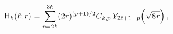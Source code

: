 \[{\sf H}_{k}(\ell;r)=\sum_{p=2k}^{3k}(2r)^{(p+1)/2}C_{k,p}\mathop{Y_{2\ell+1+p}%
\/}\nolimits\!\left(\sqrt{8r}\right),\]
